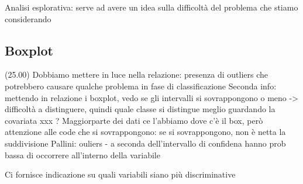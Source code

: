 Analisi esplorativa: serve ad avere un idea sulla difficoltà del problema che stiamo considerando

\subsection{Boxplot} (25.00)
Dobbiamo mettere in luce nella relazione: presenza di outliers che potrebbero causare qualche problema in fase di classificazione
Seconda info: mettendo in relazione i boxplot, vedo se gli intervalli si sovrappongono o meno -> difficoltà a distinguere, quindi quale classe si distingue meglio guardando la covariata xxx ?
Maggiorparte dei dati ce l'abbiamo dove c'è il box, però attenzione alle code che si sovrappongono: se si sovrappongono, non è netta la suddivisione
Pallini: ouliers - a seconda dell'intervallo di confidena hanno prob bassa di occorrere all'interno della variabile

Ci fornisce indicazione su quali variabili siano più discriminative